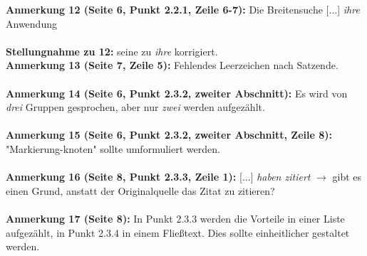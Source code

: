 \documentclass[a4paper,12pt]{book}
\begin{document}
\noindent
\textbf{Anmerkung 12 (Seite 6, Punkt 2.2.1, Zeile 6-7):}
Die Breitensuche [...] \emph{ihre} Anwendung \\
\\
\textbf{Stellungnahme zu 12:}
\glqq seine \grqq zu \emph{ihre} korrigiert.
\\

\noindent
\textbf{Anmerkung 13 (Seite 7, Zeile 5):}
Fehlendes Leerzeichen nach Satzende. \\
\\

\noindent
\textbf{Anmerkung 14 (Seite 6, Punkt 2.3.2, zweiter Abschnitt):}
Es wird von \emph{drei} Gruppen gesprochen, aber nur \emph{zwei} werden aufgezählt. \\
\\

\noindent
\textbf{Anmerkung 15 (Seite 6, Punkt 2.3.2, zweiter Abschnitt, Zeile 8):}
"Markierung-knoten" sollte umformuliert werden. \\
\\

\noindent
\textbf{Anmerkung 16 (Seite 8, Punkt 2.3.3, Zeile 1):}
[...] \emph{haben zitiert} $\rightarrow$ gibt es einen Grund, anstatt der Originalquelle das Zitat zu zitieren? \\
\\

\noindent
\textbf{Anmerkung 17 (Seite 8):}
In Punkt 2.3.3 werden die Vorteile in einer Liste aufgezählt, in Punkt 2.3.4 in einem Fließtext. Dies sollte einheitlicher gestaltet werden. \\
\\
\end{document}
